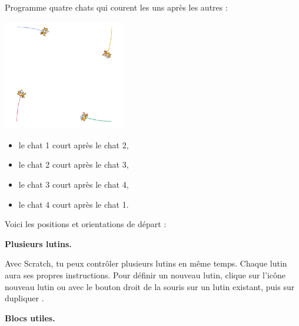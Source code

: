 \documentclass[class=report,crop=false, 12pt]{standalone}
\begin{document}




\bigskip
\bigskip

\begin{activite}


Programme quatre chats qui courent les uns après les autres :

\begin{center}
  \includegraphics[width=0.4\textwidth]{ecran-08-ex1} 
\end{center}

\begin{itemize}
  \item le chat 1 court après le chat 2,
  \item le chat 2 court après le chat 3,
  \item le chat 3 court après le chat 4,
  \item le chat 4 court après le chat 1.
\end{itemize}

\bigskip

Voici les positions et orientations de départ :

\bigskip
\textbf{Plusieurs lutins.}

Avec Scratch, tu peux contrôler plusieurs lutins en même temps.
Chaque lutin aura ses propres instructions.
Pour définir un nouveau lutin, clique sur l'icône \og nouveau lutin \fg{}
ou avec le bouton droit de la souris sur un lutin existant, puis sur \og dupliquer \fg{}.


\bigskip


\textbf{Blocs utiles.}

\begin{center}
\begin{scratch}
\end{scratch}
\end{center} 

  
\end{activite}
\end{document}
